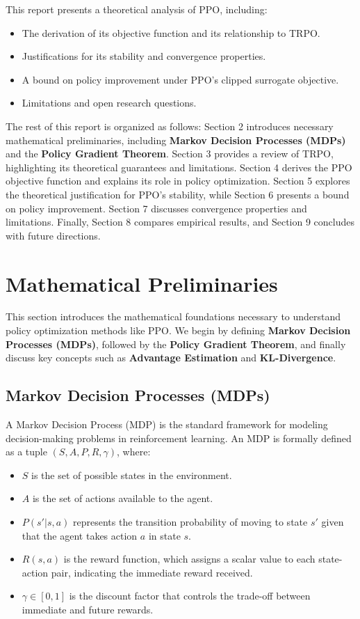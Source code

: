 \documentclass[12pt]{extreport} %
\begin{document}
This report presents a theoretical analysis of PPO, including:
\begin{itemize}
    \item The derivation of its objective function and its relationship to TRPO.
    \item Justifications for its stability and convergence properties.
    \item A bound on policy improvement under PPO's clipped surrogate objective.
    \item Limitations and open research questions.
\end{itemize}

The rest of this report is organized as follows:
Section 2 introduces necessary mathematical preliminaries, including \textbf{Markov Decision Processes (MDPs)} and the \textbf{Policy Gradient Theorem}. Section 3 provides a review of TRPO, highlighting its theoretical guarantees and limitations. Section 4 derives the PPO objective function and explains its role in policy optimization. Section 5 explores the theoretical justification for PPO's stability, while Section 6 presents a bound on policy improvement. Section 7 discusses convergence properties and limitations. Finally, Section 8 compares empirical results, and Section 9 concludes with future directions.

\section{Mathematical Preliminaries}

This section introduces the mathematical foundations necessary to understand policy optimization methods like PPO. We begin by defining \textbf{Markov Decision Processes (MDPs)}, followed by the \textbf{Policy Gradient Theorem}, and finally discuss key concepts such as \textbf{Advantage Estimation} and \textbf{KL-Divergence}.

\subsection{Markov Decision Processes (MDPs)}
A Markov Decision Process (MDP) is the standard framework for modeling decision-making problems in reinforcement learning. An MDP is formally defined as a tuple \((S, A, P, R, \gamma)\), where:

\begin{itemize}
    \item \( S \) is the set of possible states in the environment.
    \item \( A \) is the set of actions available to the agent.
    \item \( P(s' | s, a) \) represents the transition probability of moving to state \( s' \) given that the agent takes action \( a \) in state \( s \).
    \item \( R(s, a) \) is the reward function, which assigns a scalar value to each state-action pair, indicating the immediate reward received.
    \item \( \gamma \in [0,1] \) is the discount factor that controls the trade-off between immediate and future rewards.
\end{itemize}
\end{document}
